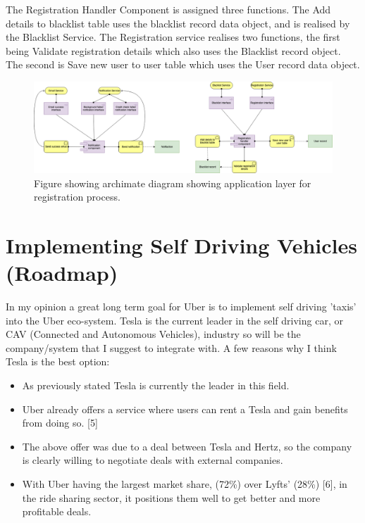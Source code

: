 \documentclass{article}
\begin{document}
    The Registration Handler Component is assigned three functions. The Add details to blacklist table uses the blacklist record data object,
    and is realised by the Blacklist Service. The Registration service realises two functions, the first being 
    Validate registration details which also uses the Blacklist record object. The second is Save new user to 
    user table which uses the User record data object.

    \begin{figure}[H]
      \centering
      \captionsetup{justification=centering}
      \includegraphics[width=12cm]{assets/arch_app.drawio.png}
      \caption{Figure showing archimate diagram showing application layer for registration process.}
      \label{fig:archimateAppLayer}
    \end{figure}

    \newpage

    \section{Implementing Self Driving Vehicles (Roadmap)}
    In my opinion a great long term goal for Uber is to implement self driving 'taxis' into the Uber eco-system. Tesla is the current leader
    in the self driving car, or CAV (Connected and Autonomous Vehicles), industry so will be the company/system that I suggest to 
    integrate with. A few reasons why I think Tesla is the best option:

    \begin{itemize}
      \item As previously stated Tesla is currently the leader in this field.
      \item Uber already offers a service where users can rent a Tesla and gain benefits from doing so. [5]
      \item The above offer was due to a deal between Tesla and Hertz, so the company is clearly willing to negotiate deals with external companies.
      \item With Uber having the largest market share, (72\%) over Lyfts' (28\%) [6], in the ride sharing sector, it positions them well to get better and more profitable deals.
    \end{itemize}
\end{document}
